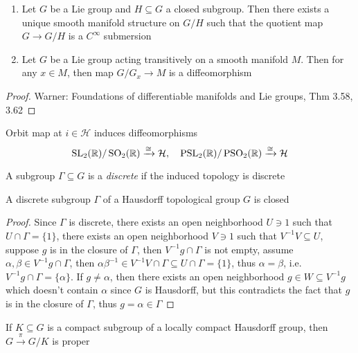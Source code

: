 \documentclass[main]{subfiles}
\begin{document}
\begin{theorem}\hfill
\begin{enumerate}
\item Let $G$ be a Lie group and $H\subseteq G$ a closed subgroup. Then there exists a unique smooth manifold structure on $G/H$ such that the quotient map $G\to G/H$ is a $C^\infty$ submersion
\item Let $G$ be a Lie group acting transitively on a smooth manifold $M$. Then for any $x\in M$, then map $G/G_x\to M$ is a diffeomorphism
\end{enumerate}
\end{theorem}

\begin{proof}
Warner: Foundations of differentiable manifolds and Lie groups, Thm 3.58, 3.62
\end{proof}

\begin{example}
Orbit map at $i\in\mathcal H$ induces diffeomorphisms
\[
\operatorname{SL}_2(\mathbb R)/\operatorname{SO}_2(\mathbb R)\xrightarrow{\cong} \mathcal H,\quad\operatorname{PSL}_2(\mathbb R)/\operatorname{PSO}_2(\mathbb R)\xrightarrow{\cong}\mathcal H
\]
\end{example}

\begin{definition}
A subgroup $\Gamma\subseteq G$ is a \textit{discrete} if the induced topology is discrete
\end{definition}

\begin{lemma}
A discrete subgroup $\Gamma$ of a Hausdorff topological group $G$ is closed
\end{lemma}

\begin{proof}
Since $\Gamma$ is discrete, there exists an open neighborhood $U\ni1$ such that $U\cap \Gamma=\{1\}$, there exists an open neighborhood $V\ni 1$ such that $V^{-1}V\subseteq U$, suppose $g$ is in the closure of $\Gamma$, then $V^{-1}g\cap\Gamma$ is not empty, assume $\alpha,\beta\in V^{-1}g\cap\Gamma$, then $\alpha\beta^{-1}\in V^{-1}V\cap\Gamma\subseteq U\cap\Gamma=\{1\}$, thus $\alpha=\beta$, i.e. $V^{-1}g\cap\Gamma=\{\alpha\}$. If $g\neq\alpha$, then there exists an open neighborhood $g\in W\subseteq V^{-1}g$ which doesn't contain $\alpha$ since $G$ is Hausdorff, but this contradicts the fact that $g$ is in the closure of $\Gamma$, thus $g=\alpha\in\Gamma$
\end{proof}

\begin{lemma}\label{G locally compact group, K compact subgroup, G->G/K is proper}
If $K\subseteq G$ is a compact subgroup of a locally compact Hausdorff group, then $G\xrightarrow\pi G/K$ is proper
\end{lemma}
\end{document}
